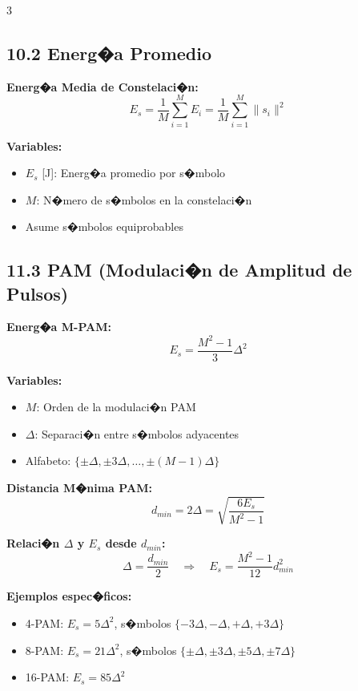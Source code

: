 ﻿\documentclass[8pt,a4paper]{article}
\begin{document}
\begin{multicols}{3}
\vspace{-2mm}
\subsection*{\small 10.2 Energ�a Promedio}
\vspace{-2mm}

\textbf{Energ�a Media de Constelaci�n:}
\[
E_s = \frac{1}{M} \sum_{i=1}^{M} E_i = \frac{1}{M} \sum_{i=1}^{M} \|s_i\|^2
\]

\textbf{Variables:}
\begin{itemize}[leftmargin=*,itemsep=0pt]
    \item $E_s$ [J]: Energ�a promedio por s�mbolo
    \item $M$: N�mero de s�mbolos en la constelaci�n
    \item Asume s�mbolos equiprobables
\end{itemize}

\vspace{-2mm}
\subsection*{\small 11.3 PAM (Modulaci�n de Amplitud de Pulsos)}
\vspace{-2mm}

\textbf{Energ�a M-PAM:}
\[
E_s = \frac{M^2 - 1}{3} \Delta^2
\]

\textbf{Variables:}
\begin{itemize}[leftmargin=*,itemsep=0pt]
    \item $M$: Orden de la modulaci�n PAM
    \item $\Delta$: Separaci�n entre s�mbolos adyacentes
    \item Alfabeto: $\{\pm\Delta, \pm3\Delta, \ldots, \pm(M-1)\Delta\}$
\end{itemize}

\textbf{Distancia M�nima PAM:}
\[
d_{min} = 2\Delta = \sqrt{\frac{6E_s}{M^2-1}}
\]

\textbf{Relaci�n $\Delta$ y $E_s$ desde $d_{min}$:}
\[
\Delta = \frac{d_{min}}{2} \quad \Rightarrow \quad E_s = \frac{M^2-1}{12}d_{min}^2
\]

\textbf{Ejemplos espec�ficos:}
\begin{itemize}[leftmargin=*,itemsep=0pt]
    \item 4-PAM: $E_s = 5\Delta^2$, s�mbolos $\{-3\Delta, -\Delta, +\Delta, +3\Delta\}$
    \item 8-PAM: $E_s = 21\Delta^2$, s�mbolos $\{\pm\Delta, \pm3\Delta, \pm5\Delta, \pm7\Delta\}$
    \item 16-PAM: $E_s = 85\Delta^2$
\end{itemize}


\end{multicols}
\end{document}
